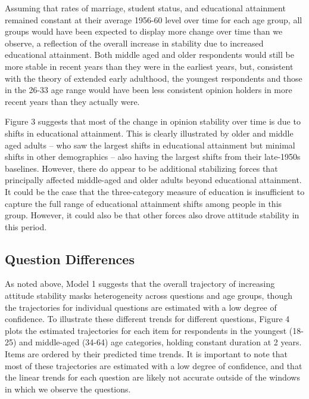 \documentclass[
  12pt,
]{article}
\begin{document}
Assuming that rates of marriage, student status, and educational attainment remained constant at their average 1956-60 level over time for each age group, all groups would have been expected to display more change over time than we observe, a reflection of the overall increase in stability due to increased educational attainment. Both middle aged and older respondents would still be more stable in recent years than they were in the earliest years, but, consistent with the theory of extended early adulthood, the youngest respondents and those in the 26-33 age range would have been less consistent opinion holders in more recent years than they actually were.

Figure 3 suggests that most of the change in opinion stability over time is due to shifts in educational attainment. This is clearly illustrated by older and middle aged adults -- who saw the largest shifts in educational attainment but minimal shifts in other demographics -- also having the largest shifts from their late-1950s baselines. However, there do appear to be additional stabilizing forces that principally affected middle-aged and older adults beyond educational attainment. It could be the case that the three-category measure of education is insufficient to capture the full range of educational attainment shifts among people in this group. However, it could also be that other forces also drove attitude stability in this period.

\hypertarget{question-differences}{%
\subsection{Question Differences}\label{question-differences}}

As noted above, Model 1 suggests that the overall trajectory of increasing attitude stability masks heterogeneity across questions and age groups, though the trajectories for individual questions are estimated with a low degree of confidence. To illustrate these different trends for different questions, Figure 4 plots the estimated trajectories for each item for respondents in the youngest (18-25) and middle-aged (34-64) age categories, holding constant duration at 2 years. Items are ordered by their predicted time trends. It is important to note that most of these trajectories are estimated with a low degree of confidence, and that the linear trends for each question are likely not accurate outside of the windows in which we observe the questions.
\end{document}
